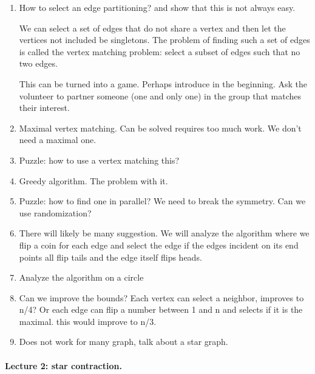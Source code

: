 \begin{notesonly}
\begin{enumerate}
\begin{enumerate}
\item How to select an edge partitioning?  
  and show that this is not always easy.

  We can select a set of edges that do not share a vertex and then let
  the vertices not included be singletons.  The problem of finding
  such a set of edges is called the vertex matching problem: select a
  subset of edges such that no two edges.

  This can be turned into a game.  Perhaps introduce in the beginning.
  Ask the volunteer to partner someone (one and only one) in the group
  that matches their interest.


\item Maximal vertex matching. Can be solved requires too much
  work. We don't need a maximal one.

\item Puzzle: how to use a vertex matching this?

\item Greedy algorithm.  The problem with it.

\item Puzzle: how to find one in parallel?  We need to break the
  symmetry.  Can we use randomization?

\item There will likely be many suggestion.  We will analyze the
  algorithm where we flip a coin for each edge and select the edge if
  the edges incident on its end points all flip tails and the edge
  itself flips heads.

\item Analyze the algorithm on a circle

\item Can we improve the bounds?  Each vertex can select a neighbor,
  improves to n/4?
  Or each edge can flip a number between 1 and n and selects if it is
  the maximal. this would improve to n/3.

\item Does not work for many graph, talk about a star graph.


\end{enumerate}

\end{enumerate}


\paragraph{Lecture 2: star contraction.} 


\end{notesonly}
